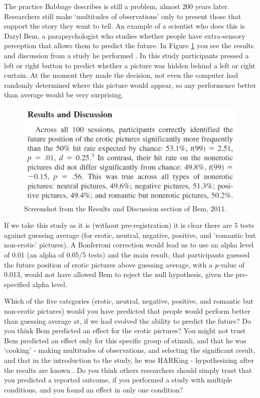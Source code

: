 \documentclass[
  oneside]{book}
\begin{document}
The practice Babbage describes is still a problem, almost 200 years later. Researchers still make `multitudes of observations' only to present those that support the story they want to tell. An example of a scientist who does this is Daryl Bem, a parapsychologist who studies whether people have extra-sensory perception that allows them to predict the future. In Figure \ref{fig:bem} you see the results and discussion from a study he performed \citep{bem_feeling_2011}. In this study participants pressed a left or right button to predict whether a picture was hidden behind a left or right curtain. At the moment they made the decision, not even the computer had randomly determined where this picture would appear, so any performence better than average would be very surprising.

\begin{figure}

{\centering \includegraphics[width=1\linewidth]{images/bem} 

}

\caption{Screenshot from the Results and Discussion section of Bem, 2011.}\label{fig:bem}
\end{figure}

If we take this study as it is (without pre-registration) it is clear there are 5 tests against guessing average (for erotic, neutral, negative, positive, and `romantic but non-erotic' pictures). A Bonferroni correction would lead us to use an alpha level of 0.01 (an alpha of 0.05/5 tests) and the main result, that participants guessed the future position of erotic pictures above guessing average, with a \emph{p}-value of 0.013, would not have allowed Bem to reject the null hypothesis, given the pre-specified alpha level.

Which of the five categories (erotic, neutral, negative, positive, and romantic but non-erotic pictures) would you have predicted that people would perform better than guessing average at, if we had evolved the ability to predict the future? Do you think Bem predicted an effect for the erotic pictures? You might not trust Bem predicted an effect only for this specific group of stimuli, and that he was `cooking' - making multitudes of observations, and selecting the significant result, and that in the introduction to the study, he was HARKing - hypothesizing after the results are known \citep{kerr_harking_1998}. Do you think others researchers should simply trust that you predicted a reported outcome, if you performed a study with multiple conditions, and you found an effect in only one condition?
\end{document}
